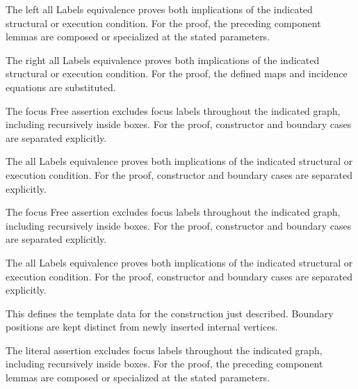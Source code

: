 The left all Labels equivalence proves both implications of the indicated structural or execution condition.
For the proof, the preceding component lemmas are composed or specialized at the stated parameters.
\par{}

The right all Labels equivalence proves both implications of the indicated structural or execution condition.
For the proof, the defined maps and incidence equations are substituted.
\par{}

The focus Free assertion excludes focus labels throughout the indicated graph, including recursively inside boxes.
For the proof, constructor and boundary cases are separated explicitly.
\par{}

The all Labels equivalence proves both implications of the indicated structural or execution condition.
For the proof, constructor and boundary cases are separated explicitly.
\par{}

The focus Free assertion excludes focus labels throughout the indicated graph, including recursively inside boxes.
For the proof, constructor and boundary cases are separated explicitly.
\par{}

The all Labels equivalence proves both implications of the indicated structural or execution condition.
For the proof, constructor and boundary cases are separated explicitly.
\par{}

This defines the template data for the construction just described. Boundary positions are kept distinct from newly inserted internal vertices.
\par{}

The literal assertion excludes focus labels throughout the indicated graph, including recursively inside boxes.
For the proof, the preceding component lemmas are composed or specialized at the stated parameters.
\par{}


